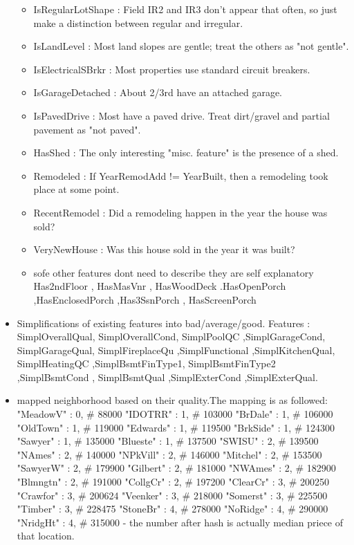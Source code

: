\documentclass[11pt, a4paper , landscape]{article}
\providecommand{\tightlist}{%
      \setlength{\itemsep}{0pt}\setlength{\parskip}{0pt}}
\begin{document}
\begin{itemize}
  \begin{itemize}
  \tightlist
  \item
    IsRegularLotShape : Field IR2 and IR3 don't appear that often, so
    just make a distinction between regular and irregular.
  \item
    IsLandLevel : Most land slopes are gentle; treat the others as "not
    gentle".
  \item
    IsElectricalSBrkr : Most properties use standard circuit breakers.
  \item
    IsGarageDetached : About 2/3rd have an attached garage.
  \item
    IsPavedDrive : Most have a paved drive. Treat dirt/gravel and
    partial pavement as "not paved".
  \item
    HasShed : The only interesting "misc. feature" is the presence of a
    shed.
  \item
    Remodeled : If YearRemodAdd != YearBuilt, then a remodeling took
    place at some point.
  \item
    RecentRemodel : Did a remodeling happen in the year the house was
    sold?
  \item
    VeryNewHouse : Was this house sold in the year it was built?
  \item
    sofe other features dont need to describe they are self explanatory
    Has2ndFloor , HasMasVnr , HasWoodDeck .HasOpenPorch
    ,HasEnclosedPorch ,Has3SsnPorch , HasScreenPorch
  \end{itemize}
\item
  Simplifications of existing features into bad/average/good. Features :
  SimplOverallQual, SimplOverallCond, SimplPoolQC ,SimplGarageCond,
  SimplGarageQual, SimplFireplaceQu ,SimplFunctional ,SimplKitchenQual,
  SimplHeatingQC ,SimplBsmtFinType1, SimplBsmtFinType2 ,SimplBsmtCond ,
  SimplBsmtQual ,SimplExterCond ,SimplExterQual.
\item
  mapped neighborhood based on their quality.The mapping is as followed:
  "MeadowV" : 0, \# 88000 "IDOTRR" : 1, \# 103000 "BrDale" : 1, \#
  106000 "OldTown" : 1, \# 119000 "Edwards" : 1, \# 119500 "BrkSide" :
  1, \# 124300 "Sawyer" : 1, \# 135000 "Blueste" : 1, \# 137500 "SWISU"
  : 2, \# 139500 "NAmes" : 2, \# 140000 "NPkVill" : 2, \# 146000
  "Mitchel" : 2, \# 153500 "SawyerW" : 2, \# 179900 "Gilbert" : 2, \#
  181000 "NWAmes" : 2, \# 182900 "Blmngtn" : 2, \# 191000 "CollgCr" : 2,
  \# 197200 "ClearCr" : 3, \# 200250 "Crawfor" : 3, \# 200624 "Veenker"
  : 3, \# 218000 "Somerst" : 3, \# 225500 "Timber" : 3, \# 228475
  "StoneBr" : 4, \# 278000 "NoRidge" : 4, \# 290000 "NridgHt" : 4, \#
  315000 - the number after hash is actually median priece of that
  location.
\end{itemize}
\end{document}
